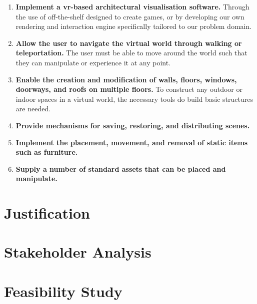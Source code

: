     \begin{enumerate}
        \item{\textbf{Implement a \acrshort{vr}-based architectural visualisation software.}} Through the use of off-the-shelf  designed to create games, or by developing our own rendering and interaction engine specifically tailored to our problem domain.
        \item{\textbf{Allow the user to navigate the virtual world through walking or teleportation.}} The user must be able to move around the world such that they can manipulate or experience it at any point.
        \item{\textbf{Enable the creation and modification of walls, floors, windows, doorways, and roofs on multiple floors.}} To construct any outdoor or indoor spaces in a virtual world, the necessary tools do build basic structures are needed.
        \item{\textbf{Provide mechanisms for saving, restoring, and distributing scenes.}} 
        \item{\textbf{Implement the placement, movement, and removal of static items such as furniture.}}
        \item{\textbf{Supply a number of standard assets that can be placed and manipulate.}}
    \end{enumerate}


\section{Justification}

    
\section{Stakeholder Analysis}


\section{Feasibility Study}

    
